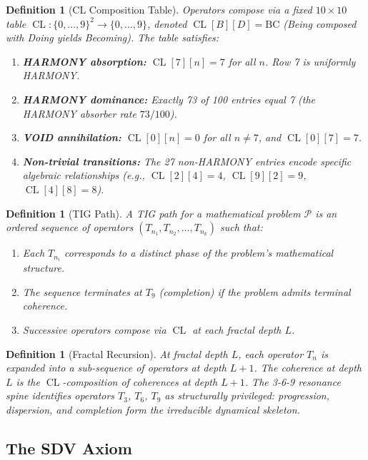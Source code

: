 \documentclass[11pt]{article}
\newtheorem{definition}[theorem]{Definition}
\DeclareMathOperator{\CL}{CL}
\begin{document}
\begin{definition}[CL Composition Table]
\label{def:cl}
Operators compose via a fixed $10 \times 10$ table
$\CL : \{0,\ldots,9\}^2 \to \{0,\ldots,9\}$, denoted
$\CL[B][D] = \mathrm{BC}$ (Being composed with Doing yields Becoming).
The table satisfies:
\begin{enumerate}
\item \textbf{HARMONY absorption:} $\CL[7][n] = 7$ for all $n$.
Row 7 is uniformly HARMONY.
\item \textbf{HARMONY dominance:} Exactly 73 of 100 entries equal 7
(the HARMONY absorber rate $73/100$).
\item \textbf{VOID annihilation:} $\CL[0][n] = 0$ for all
$n \neq 7$, and $\CL[0][7] = 7$.
\item \textbf{Non-trivial transitions:} The 27 non-HARMONY entries
encode specific algebraic relationships (e.g.,
$\CL[2][4] = 4$, $\CL[9][2] = 9$, $\CL[4][8] = 8$).
\end{enumerate}
\end{definition}

\begin{definition}[TIG Path]
\label{def:tig-path}
A \emph{TIG path} for a mathematical problem $\mathcal{P}$ is an
ordered sequence of operators $(T_{n_1}, T_{n_2}, \ldots, T_{n_k})$
such that:
\begin{enumerate}
\item Each $T_{n_i}$ corresponds to a distinct phase of the
problem's mathematical structure.
\item The sequence terminates at $T_9$ (completion) if the problem
admits terminal coherence.
\item Successive operators compose via $\CL$ at each fractal
depth $L$.
\end{enumerate}
\end{definition}

\begin{definition}[Fractal Recursion]
\label{def:fractal}
At fractal depth $L$, each operator $T_n$ is expanded into a
sub-sequence of operators at depth $L+1$.  The coherence at depth $L$
is the $\CL$-composition of coherences at depth $L+1$.  The
\emph{3-6-9 resonance spine} identifies operators $T_3$, $T_6$, $T_9$
as structurally privileged: progression, dispersion, and completion
form the irreducible dynamical skeleton.
\end{definition}

\subsection{The SDV Axiom}
\label{subsec:sdv}
\end{document}

